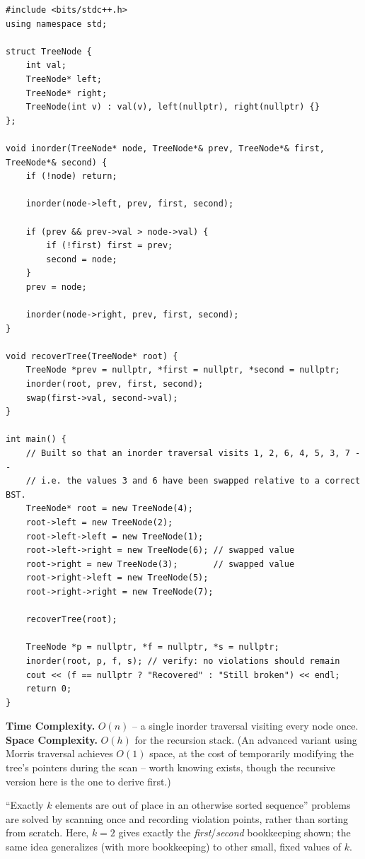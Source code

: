 \begin{lstlisting}
#include <bits/stdc++.h>
using namespace std;

struct TreeNode {
    int val;
    TreeNode* left;
    TreeNode* right;
    TreeNode(int v) : val(v), left(nullptr), right(nullptr) {}
};

void inorder(TreeNode* node, TreeNode*& prev, TreeNode*& first, TreeNode*& second) {
    if (!node) return;

    inorder(node->left, prev, first, second);

    if (prev && prev->val > node->val) {
        if (!first) first = prev;
        second = node;
    }
    prev = node;

    inorder(node->right, prev, first, second);
}

void recoverTree(TreeNode* root) {
    TreeNode *prev = nullptr, *first = nullptr, *second = nullptr;
    inorder(root, prev, first, second);
    swap(first->val, second->val);
}

int main() {
    // Built so that an inorder traversal visits 1, 2, 6, 4, 5, 3, 7 --
    // i.e. the values 3 and 6 have been swapped relative to a correct BST.
    TreeNode* root = new TreeNode(4);
    root->left = new TreeNode(2);
    root->left->left = new TreeNode(1);
    root->left->right = new TreeNode(6); // swapped value
    root->right = new TreeNode(3);       // swapped value
    root->right->left = new TreeNode(5);
    root->right->right = new TreeNode(7);

    recoverTree(root);

    TreeNode *p = nullptr, *f = nullptr, *s = nullptr;
    inorder(root, p, f, s); // verify: no violations should remain
    cout << (f == nullptr ? "Recovered" : "Still broken") << endl;
    return 0;
}
\end{lstlisting}

\begin{complexitybox}
\textbf{Time Complexity.} $O(n)$ -- a single inorder traversal visiting
every node once.
\textbf{Space Complexity.} $O(h)$ for the recursion stack. (An advanced
variant using Morris traversal achieves $O(1)$ space, at the cost of
temporarily modifying the tree's pointers during the scan -- worth
knowing exists, though the recursive version here is the one to derive
first.)
\end{complexitybox}

\begin{takeawaybox}
``Exactly $k$ elements are out of place in an otherwise sorted sequence''
problems are solved by scanning once and recording violation points,
rather than sorting from scratch. Here, $k=2$ gives exactly the
\textit{first}/\textit{second} bookkeeping shown; the same idea
generalizes (with more bookkeeping) to other small, fixed values of $k$.
\end{takeawaybox}
